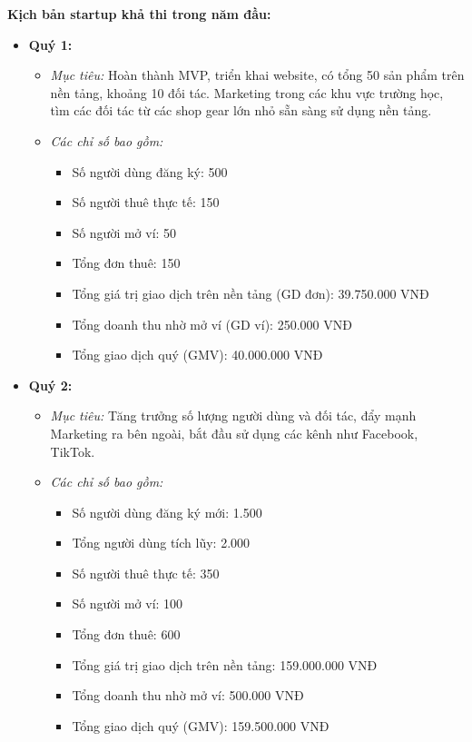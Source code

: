\textbf{Kịch bản startup khả thi trong năm đầu:}
\begin{itemize}
    \item \textbf{Quý 1:}
    \begin{itemize}
        \item \textit{Mục tiêu:} Hoàn thành MVP, triển khai website, có tổng 50 sản phẩm trên nền tảng, khoảng 10 đối tác. Marketing trong các khu vực trường học, tìm các đối tác từ các shop gear lớn nhỏ sẵn sàng sử dụng nền tảng.
        \item \textit{Các chỉ số bao gồm:}
        \begin{itemize}
            \item Số người dùng đăng ký: 500
            \item Số người thuê thực tế: 150
            \item Số người mở ví: 50
            \item Tổng đơn thuê: 150
            \item Tổng giá trị giao dịch trên nền tảng (GD đơn): 39.750.000 VNĐ
            \item Tổng doanh thu nhờ mở ví (GD ví): 250.000 VNĐ
            \item Tổng giao dịch quý (GMV): 40.000.000 VNĐ
        \end{itemize}
    \end{itemize}
    \item \textbf{Quý 2:}
    \begin{itemize}
        \item \textit{Mục tiêu:} Tăng trưởng số lượng người dùng và đối tác, đẩy mạnh Marketing ra bên ngoài, bắt đầu sử dụng các kênh như Facebook, TikTok.
        \item \textit{Các chỉ số bao gồm:}
        \begin{itemize}
            \item Số người dùng đăng ký mới: 1.500
            \item Tổng người dùng tích lũy: 2.000
            \item Số người thuê thực tế: 350
            \item Số người mở ví: 100
            \item Tổng đơn thuê: 600
            \item Tổng giá trị giao dịch trên nền tảng: 159.000.000 VNĐ
            \item Tổng doanh thu nhờ mở ví: 500.000 VNĐ
            \item Tổng giao dịch quý (GMV): 159.500.000 VNĐ

\end{itemize}
\end{itemize}
\end{itemize}
